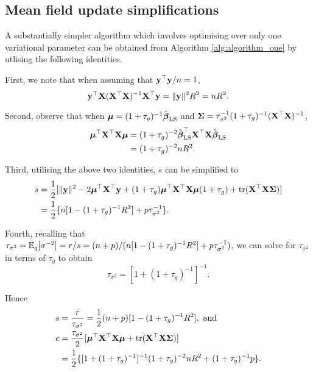 \documentclass{amsart}[12pt]
\begin{document}
\subsection{Mean field update simplifications}
\label{sec:mean_field_updates}

A substantially simpler algorithm  which involves optimising over only one variational parameter can be
obtained from Algorithm \ref{alg:algorithm_one} by utlising the following identities.

\noindent First, we note that when assuming that ${\bf y}^\top {\bf y} / n = 1$,
\[{\bf y}^\top {\bf X} ({\bf X}^\top {\bf X})^{-1} {\bf X}^\top {\bf y} =\|{\bf y}\|^2 R^2 = n R^2.\]

\noindent Second, observe that when ${\boldsymbol \mu} = (1 + \tau_g)^{-1} \hat{{\boldsymbol \beta}}_{\text{LS}}$ and ${\boldsymbol \Sigma} = \tau_{\sigma^2}^{-1} (1 + \tau_g)^{-1} ({\bf X}^\top {\bf X})^{-1}$,
\begin{align*}
	{\boldsymbol\mu}^\top {\bf X}^\top {\bf X} {\boldsymbol\mu} & = (1 + \tau_g)^{-2} \hat{{\boldsymbol \beta}}_{\text{LS}}^\top {\bf X}^\top {\bf X} \hat{{\boldsymbol \beta}}_{\text{LS}}                                                        \\
	                            & = (1 + \tau_g)^{-2} n R^2.                                                                                           
\end{align*}

\noindent Third, utilising the above two identities, $s$ can be simplified to
\begin{align*}
	s & = \frac{1}{2} [\|{\bf y}\|^2 - 2 {\boldsymbol \mu}^\top {\bf X}^\top {\bf y} + (1 + \tau_g) {\boldsymbol \mu}^\top {\bf X}^\top {\bf X} {\boldsymbol\mu} (1 + \tau_g) +  \text{tr} ({\bf X}^\top {\bf X} {\boldsymbol\Sigma})]                 \\
	  & = \frac{1}{2} \{ n[1 - (1 + \tau_g)^{-1} R^2] + p \tau_{\sigma^2}^{-1} \}.                                                                                 
\end{align*}

\noindent Fourth, recalling that $\tau_{\sigma^2} = \mathbb{E}_q [\sigma^{-2}] = r/s = (n+p)/(n[1 - (1 + \tau_g)^{-1} R^2] + p \tau_{\sigma^2}^{-1})$, we can solve for $\tau_{\sigma^2}$ in terms of $\tau_g$ to obtain
\[
	\tau_{\sigma^2} = [1 + (1 + \tau_g)^{-1}]^{-1}.
\]

\noindent Hence
\begin{align*}
	s & = \frac{r}{\tau_{\sigma^2}} = \frac{1}{2} (n + p) [1 - (1 + \tau_g)^{-1} R^2], \text{ and }                \\
	c & = \frac{\tau_{\sigma^2}}{2}[{\boldsymbol \mu}^\top {\bf X}^\top {\bf X} {\boldsymbol\mu} + \text{tr} ({\bf X}^\top {\bf X} {\boldsymbol\Sigma})]                      \\
	  & = \frac{1}{2} \{ [1 + (1 + \tau_g)^{-1}]^{-1} (1 + \tau_g)^{-2} n R^2 + (1 + \tau_g)^{-1} p\}.             
\end{align*}
\end{document}
